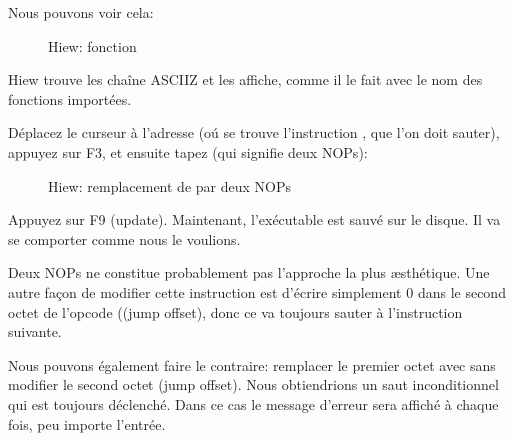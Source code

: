 Nous pouvons voir cela:

\begin{figure}[H]
\centering
{}
\caption{Hiew: fonction \main}
\label{fig:scanf_ex3_hiew_1}
\end{figure}

Hiew trouve les chaîne \ac{ASCIIZ} et les affiche, comme il le fait avec le nom
des fonctions importées.

\clearpage
Déplacez le curseur à l'adresse  (oú se trouve l'instruction ,
que l'on doit sauter), appuyez sur F3, et ensuite tapez  (qui signifie deux
\ac{NOP}s):

\begin{figure}[H]
\centering
{}
\caption{Hiew: remplacement de  par deux \ac{NOP}s}
\label{fig:scanf_ex3_hiew_2}
\end{figure}

Appuyez sur F9 (update). Maintenant, l'exécutable est sauvé sur le disque. Il va
se comporter comme nous le voulions.

Deux \ac{NOP}s ne constitue probablement pas l'approche la plus \ae{}sthétique.
Une autre façon de modifier cette instruction est d'écrire simplement 0 dans le
second octet de l'opcode ((\gls{jump offset}), donc ce  va toujours sauter
à l'instruction suivante.

Nous pouvons également faire le contraire: remplacer le premier octet avec 
sans modifier le second octet (\gls{jump offset}).
Nous obtiendrions un saut inconditionnel qui est toujours déclenché.
Dans ce cas le message d'erreur sera affiché à chaque fois, peu importe l'entrée.

